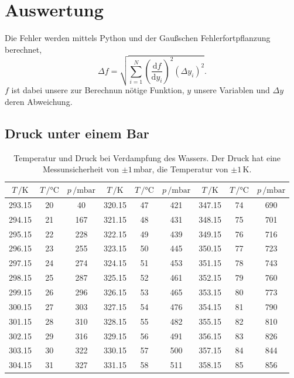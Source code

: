 \section{Auswertung}
\label{sec:Auswertung}
Die Fehler werden mittels Python und der Gaußschen Fehlerfortpflanzung berechnet,
\begin{equation}
\Delta f=\sqrt{\sum_{i=1}^N\left(\frac{\text{d}f}{\text{d}y_i}\right)^2(\Delta y_i)^2}.
\label{eq:Gauß}
\end{equation}
$f$ ist dabei unsere zur Berechnun nötige Funktion, $y$ unsere Variablen und $\Delta y$ deren Abweichung.
\subsection{Druck unter einem Bar}
\begin{table}
  \centering
  \caption{Temperatur und Druck bei Verdampfung des Wassers. Der Druck hat eine Messunsicherheit von
  $\pm1$\,mbar, die Temperatur von $\pm 1$\,K.}
  \label{tab:Messreihe_1}
  \begin{tabular}{
  c c c||c c c||c c c
}
\toprule 
$T\,/ \unit{\kelvin}$ & $T\,/ \unit{\celsius}$ & $p\,/ \text{mbar}$ &
$T\,/ \unit{\kelvin}$ & $T\,/ \unit{\celsius}$ & $p\,/ \text{mbar}$ &
$T\,/ \unit{\kelvin}$ & $T\,/ \unit{\celsius}$ & $p\,/ \text{mbar}$ \\
\midrule
293.15 & 20 & 40  & 320.15 & 47 & 421 & 347.15 & 74 & 690 \\
294.15 & 21 & 167 & 321.15 & 48 & 431 & 348.15 & 75 & 701 \\    
295.15 & 22 & 228 & 322.15 & 49 & 439 & 349.15 & 76 & 716 \\                      
296.15 & 23 & 255 & 323.15 & 50 & 445 & 350.15 & 77 & 723 \\      
297.15 & 24 & 274 & 324.15 & 51 & 453 & 351.15 & 78 & 743 \\      
298.15 & 25 & 287 & 325.15 & 52 & 461 & 352.15 & 79 & 760 \\      
299.15 & 26 & 296 & 326.15 & 53 & 465 & 353.15 & 80 & 773 \\      
300.15 & 27 & 303 & 327.15 & 54 & 476 & 354.15 & 81 & 790 \\     
301.15 & 28 & 310 & 328.15 & 55 & 482 & 355.15 & 82 & 810 \\  
302.15 & 29 & 316 & 329.15 & 56 & 491 & 356.15 & 83 & 826 \\  
303.15 & 30 & 322 & 330.15 & 57 & 500 & 357.15 & 84 & 844 \\
304.15 & 31 & 327 & 331.15 & 58 & 511 & 358.15 & 85 & 856 \\

\end{tabular}
\end{table}
